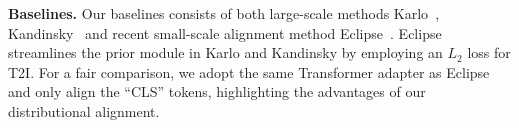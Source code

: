 
\noindent\textbf{Baselines.} Our baselines consists of both large-scale methods Karlo~\citep{kakaobrain2022karlo-v1-alpha}, Kandinsky~\citep{razzhigaev2023kandinsky} and recent small-scale alignment method Eclipse~\citep{patel2024eclipse}. 
Eclipse streamlines the prior module in Karlo and Kandinsky by employing an $L_2$ loss for T2I. 
For a fair comparison, we adopt the same Transformer adapter as Eclipse and only align the “CLS” tokens, highlighting the advantages of our distributional alignment. %






